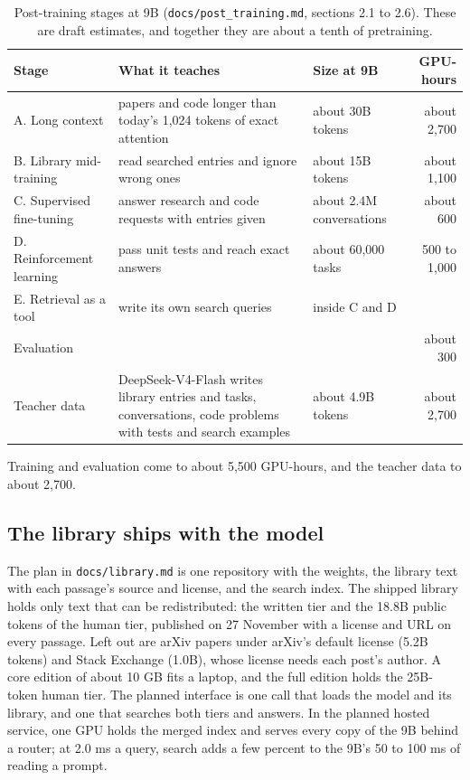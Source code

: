 \documentclass[11pt,letterpaper]{article}
\begin{document}
\begin{table}[H]
\centering\small
\caption{Post-training stages at 9B (\texttt{docs/post\_training.md}, sections 2.1 to 2.6). These are draft estimates, and together they are about a tenth of pretraining.}
\label{tab:post}
\begin{tabularx}{\linewidth}{@{}l L l r@{}}
\toprule
Stage & What it teaches & Size at 9B & GPU-hours \\
\midrule
A. Long context & papers and code longer than today's 1,024 tokens of exact attention & about 30B tokens & about 2,700 \\
B. Library mid-training & read searched entries and ignore wrong ones & about 15B tokens & about 1,100 \\
C. Supervised fine-tuning & answer research and code requests with entries given & about 2.4M conversations & about 600 \\
D. Reinforcement learning & pass unit tests and reach exact answers & about 60,000 tasks & 500 to 1,000 \\
E. Retrieval as a tool & write its own search queries & inside C and D & \\
Evaluation & & & about 300 \\
Teacher data & DeepSeek-V4-Flash writes library entries and tasks, conversations, code problems with tests and search examples & about 4.9B tokens & about 2,700 \\
\bottomrule
\end{tabularx}
\end{table}

Training and evaluation come to about 5,500 GPU-hours, and the teacher data to about 2,700.

\subsection{The library ships with the model}

The plan in \texttt{docs/library.md} is one repository with the weights, the library text with each passage's source and license, and the search index.
The shipped library holds only text that can be redistributed: the written tier and the 18.8B public tokens of the human tier, published on 27 November with a license and URL on every passage. Left out are arXiv papers under arXiv's default license (5.2B tokens) and Stack Exchange (1.0B), whose license needs each post's author.
A core edition of about 10 GB fits a laptop, and the full edition holds the 25B-token human tier.
The planned interface is one call that loads the model and its library, and one that searches both tiers and answers.
In the planned hosted service, one GPU holds the merged index and serves every copy of the 9B behind a router; at 2.0 ms a query, search adds a few percent to the 9B's 50 to 100 ms of reading a prompt.
\end{document}
